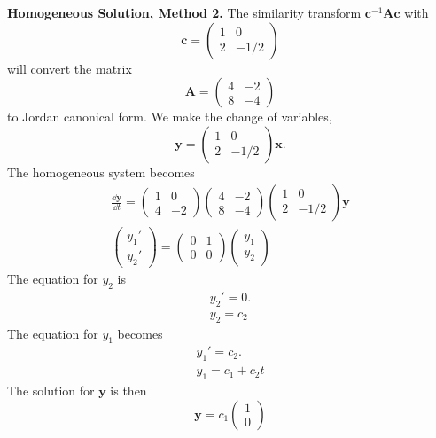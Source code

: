 \begin{Solution}
  \textbf{Homogeneous Solution, Method 2.}
  The similarity transform $\mathbf{c}^{-1} \mathbf{A} \mathbf{c}$ with
  \[
  \mathbf{c} = \begin{pmatrix} 1 & 0 \\ 2 & -1/2 \end{pmatrix}
  \]
  will convert the matrix 
  \[
  \mathbf{A} = \begin{pmatrix} 4 & -2 \\ 8 & -4 \end{pmatrix} 
  \]
  to Jordan canonical form.  We make the change of variables,
  \[
  \mathbf{y} = \begin{pmatrix} 1 & 0 \\ 2 & -1/2 \end{pmatrix} \mathbf{x}.
  \]
  The homogeneous system becomes
  \begin{gather*}
    \frac{\dd \mathbf{y}}{\dd t} = 
    \begin{pmatrix} 1 & 0 \\ 4 & -2 \end{pmatrix}
    \begin{pmatrix} 4 & -2 \\ 8 & -4 \end{pmatrix}
    \begin{pmatrix} 1 & 0 \\ 2 & -1/2 \end{pmatrix}
    \mathbf{y} \\
    \begin{pmatrix} y_1' \\ y_2' \end{pmatrix} = 
    \begin{pmatrix} 0 & 1 \\ 0 & 0 \end{pmatrix}
    \begin{pmatrix} y_1 \\ y_2 \end{pmatrix}
  \end{gather*}
  The equation for $y_2$ is
  \begin{gather*}
    y_2' = 0. \\
    y_2 = c_2
  \end{gather*}
  The equation for $y_1$ becomes
  \begin{gather*}
    y_1' = c_2. \\
    y_1 = c_1 + c_2 t
  \end{gather*}
  The solution for $\mathbf{y}$ is then
  \[
  \mathbf{y} = c_1 \begin{pmatrix} 1 \\ 0 \end{pmatrix}
\]
\end{Solution}

